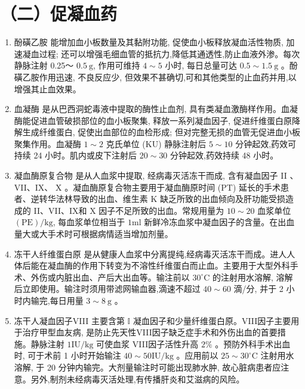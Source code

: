 \documentclass[10pt]{article}
\begin{document}
\section*{（二）促凝血药}
\begin{enumerate}
  \item 酚磺乙胺 能增加血小板数量及其黏附功能, 促使血小板释放凝血活性物质, 加速凝血过程; 还可以增强毛细血管的抵抗力,降低其通透性,防止血液外渗。每次静脉注射 0.25～ $0.5 \mathrm{~g}$, 作用可维持 $4 \sim 5$ 小时, 每日总量可达 $0.5 \sim 1.5 \mathrm{~g}$ 。酚磺乙胺作用迅速, 不良反应少, 但效果不甚确切,可和其他类型的止血药并用,以增强其止血效果。

  \item 血凝酶 是从巴西洞蛇毒液中提取的酶性止血剂, 具有类凝血激酶样作用。血凝酶能促进血管破损部位的血小板聚集, 释放一系列凝血因子, 促进纤维蛋白原降解生成纤维蛋白, 促使出血部位的血检形成; 但对完整无损的血管无促进血小板聚集作用。血凝酶 $1 \sim 2$ 克氏单位 (KU) 静脉注射后 $5 \sim 10$ 分钟起效,药效可持续 24 小时。肌内或皮下注射后 $20 \sim 30$ 分钟起效,药效持续 48 小时。

  \item 凝血酶原复合物 是从人血浆中提取, 经病毒灭活冻干而成, 含有凝血因子 II 、VII、IX、 $\mathrm{X}$ 。凝血酶原复合物主要用于凝血酶原时间 (PT) 延长的手术患者、逆转华法林导致的出血、维生素 $\mathrm{K}$ 缺乏所致的出血倾向及肝功能受损造成的 II、VII、IX和 X 因子不足所致的出血。常规用量为 $10 \sim 20$ 血浆单位 $(\mathrm{PE}) / \mathrm{kg}$, 每血浆单位相当于 $1 \mathrm{ml}$ 新鲜冷冻血浆中凝血因子的含量。在出血量大或大手术时可根据病情适当增加剂量。

  \item 冻干人纤维蛋白原 是从健康人血浆中分离提纯,经病毒灭活冻干而成。进人人体后能在凝血酶的作用下转变为不溶性纤维蛋白而止血。主要用于大型外科手术、外伤或内脏出血、产后大出血等。输注前以 $30^{\circ} \mathrm{C}$ 的注射用水溶解, 溶解后立即使用。输注时须用带滤网输血器,滴速不超过 $40 \sim 60$ 滴/分, 并于 2 小时内输完,每日用量 $3 \sim 8 \mathrm{~g}$ 。

  \item 冻干人凝血因子VIII 主要含第 $\mathbb{I}$ 凝血因子和少量纤维蛋白原。VIII因子主要用于治疗甲型血友病, 是防止先天性VIII因子缺乏症手术和外伤出血的首要措施。静脉注射 $1 \mathrm{IU} / \mathrm{kg}$ 可使血浆 VIII因子活性升高 $2 \%$ 。预防外科手术出血时, 可于术前 1 小时开始输注 $40 \sim 50 \mathrm{IU} / \mathrm{kg}$ 。应用前以 $25 \sim 30^{\circ} \mathrm{C}$ 注射用水溶解, 于 20 分钟内输完。大剂量输注时可能出现肺水肿, 故心脏病患者应注意。另外,制剂未经病毒灭活处理,有传播肝炎和艾滋病的风险。


\end{enumerate}
\end{document}

